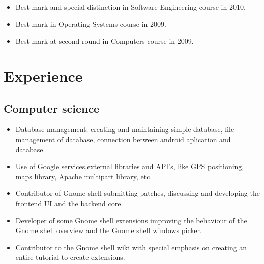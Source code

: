 {
    \begin{itemize}
        \item Best mark and special distinction in Software Engineering course in 2010.
        \item Best mark in Operating Systems course in 2009.
        \item Best mark at second round in Computers course in 2009.
    \end{itemize}
}



\section{Experience}

\subsection{Computer science}
{
    \begin{itemize}
      \item Database management: creating and maintaining simple database, file management of database, connection between android aplication and database.
      \item Use of Google services,external libraries and API's, like GPS positioning, maps library, Apache multipart library, etc.
    \end{itemize}
}

{
    \begin{itemize}
      \item Contributor of Gnome shell submitting patches, discussing and developing the frontend UI and the backend core.
      \item Developer of some Gnome shell extensions improving the behaviour of the Gnome shell overview and the Gnome shell windows picker.
      \item Contributor to the Gnome shell wiki with special emphasis on creating an entire tutorial to create extensions.
    \end{itemize}
}

